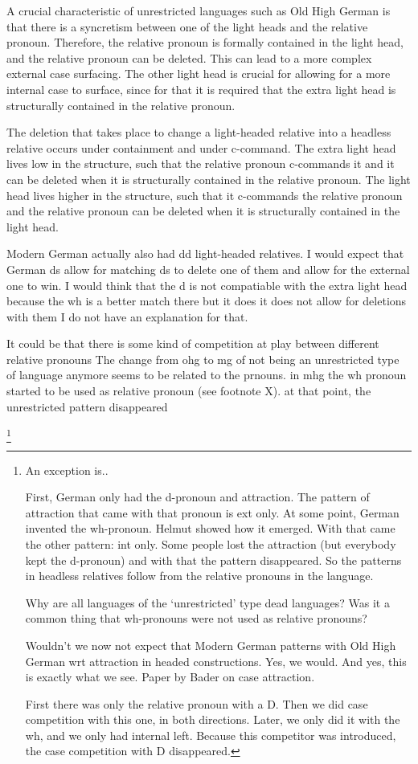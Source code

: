 A crucial characteristic of unrestricted languages such as Old High German is that there is a syncretism between one of the light heads and the relative pronoun. Therefore, the relative pronoun is formally contained in the light head, and the relative pronoun can be deleted. This can lead to a more complex external case surfacing. The other light head is crucial for allowing for a more internal case to surface, since for that it is required that the extra light head is structurally contained in the relative pronoun.

The deletion that takes place to change a light-headed relative into a headless relative occurs under containment and under c-command. The extra light head lives low in the structure, such that the relative pronoun c-commands it and it can be deleted when it is structurally contained in the relative pronoun. The light head lives higher in the structure, such that it c-commands the relative pronoun and the relative pronoun can be deleted when it is structurally contained in the light head.

Modern German actually also had dd light-headed relatives. I would expect that German ds allow for matching ds to delete one of them and allow for the external one to win. I would think that the d is not compatiable with the extra light head because the wh is a better match there
but it does it does not allow for deletions with them
I do not have an explanation for that.

It could be that there is some kind of competition at play between different relative pronouns
The change from ohg to mg of not being an unrestricted type of language anymore seems to be related to the prnouns. in mhg the wh pronoun started to be used as relative pronoun (see footnote X). at that point, the unrestricted pattern disappeared

\footnote{
An exception is..

First, German only had the d-pronoun and attraction. The pattern of attraction that came with that pronoun is ext only.
At some point, German invented the wh-pronoun. Helmut showed how it emerged. With that came the other pattern: int only. Some people lost the attraction (but everybody kept the d-pronoun) and with that the pattern disappeared.
So the patterns in headless relatives follow from the relative pronouns in the language.

Why are all languages of the `unrestricted' type dead languages?
Was it a common thing that wh-pronouns were not used as relative pronouns?

Wouldn't we now not expect that Modern German patterns with Old High German wrt attraction in headed constructions. Yes, we would. And yes, this is exactly what we see. Paper by Bader on case attraction.

First there was only the relative pronoun with a D. Then we did case competition with this one, in both directions. Later, we only did it with the wh, and we only had internal left. Because this competitor was introduced, the case competition with D disappeared.
}
